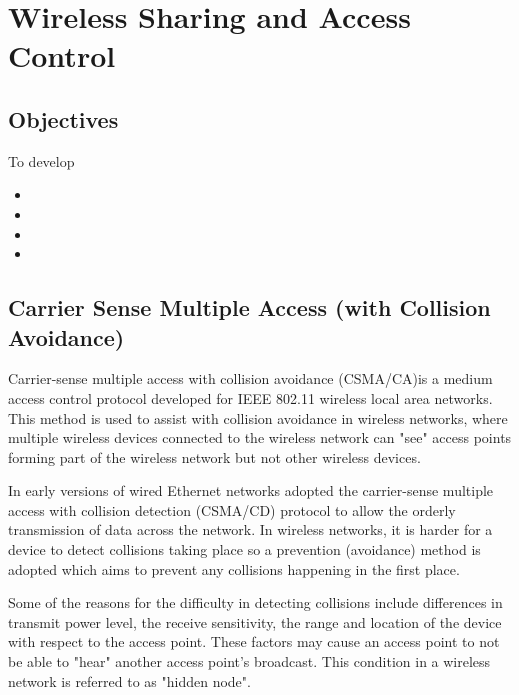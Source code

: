 \chapter{Wireless Sharing and Access Control}\label{waccess}

\minitoc 

\clearpage
\section*{Objectives}
To develop 
\begin{itemize}

\item 

\item 

\item 

\item 

\end{itemize}

\section{Carrier Sense Multiple Access (with Collision Avoidance)}

Carrier-sense multiple access with collision avoidance (CSMA/CA)is a medium access control protocol developed for IEEE 802.11 wireless local area networks.  This method is used to assist with collision avoidance in wireless networks, where multiple wireless devices connected to the wireless network can "see" access points forming part of the wireless network but not other wireless devices. 

In early versions of wired Ethernet networks adopted the carrier-sense multiple access with collision detection (CSMA/CD) protocol to allow the orderly transmission of data across the network. In wireless networks, it is harder for a device to detect collisions taking place so a prevention (avoidance) method is adopted which aims to prevent any collisions happening in the first place.  

Some of the reasons for the difficulty in detecting collisions include differences in transmit power level, the receive sensitivity, the range and location of the device with respect to the access point. These factors may cause an access point to not be able to "hear" another access point's broadcast. This condition in a wireless network is referred to as "hidden node".

